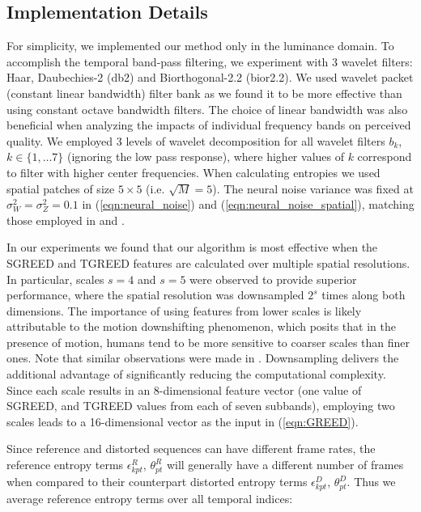 \documentclass[journal]{IEEEtran}
\newcommand{\ie}{{i}.{e}.}
\begin{document}
\subsection{Implementation Details}
For simplicity, we implemented our method only in the luminance domain. To accomplish the temporal band-pass filtering, we experiment with 3 wavelet filters: Haar, Daubechies-2 (db2) and Biorthogonal-2.2 (bior2.2). We used wavelet packet (constant linear bandwidth) filter bank \cite{coifman1992entropy} as we found it to be more effective than using constant octave bandwidth filters. The choice of linear bandwidth was also beneficial when analyzing the impacts of individual frequency bands on perceived quality. We employed 3 levels of wavelet decomposition for all wavelet filters $b_k$, $k \in \{1,\ldots 7\}$ (ignoring the low pass response), where higher values of $k$ correspond to filter with higher center frequencies. When calculating entropies we used spatial patches of size $5 \times 5$ (\ie{ }$\sqrt{M} = 5$). The neural noise variance was fixed at $\sigma_W ^2 = \sigma_Z ^2 = 0.1$ in (\ref{eqn:neural_noise}) and (\ref{eqn:neural_noise_spatial}), matching those employed in \cite{soundararajan2012video} and \cite{bampis2017speed}. 

In our experiments we found that our algorithm is most effective when the SGREED and TGREED features are calculated over multiple spatial resolutions. In particular, scales $s = 4$ and $s = 5$ were observed to provide superior performance, where the spatial resolution was downsampled $2^s$ times along both dimensions. The importance of using features from lower scales is likely attributable to the motion downshifting phenomenon, which posits that in the presence of motion, humans tend to be more sensitive to coarser scales than finer ones. Note that similar observations were made in \cite{soundararajan2012video,bampis2017speed,bampis2018spatiotemporal}. Downsampling delivers the additional advantage of significantly reducing the computational complexity. Since each scale results in an 8-dimensional feature vector (one value of SGREED, and TGREED values from each of seven subbands), employing two scales leads to a 16-dimensional vector as the input in (\ref{eqn:GREED}). 

Since reference and distorted sequences can have different frame rates, the reference entropy terms $\epsilon_{kpt} ^R$, $\theta_{pt} ^R$ will generally have a different number of frames when compared to their counterpart distorted entropy terms $\epsilon_{kpt} ^D$, $\theta_{pt} ^D$. Thus we average reference entropy terms over all temporal indices:
\end{document}
